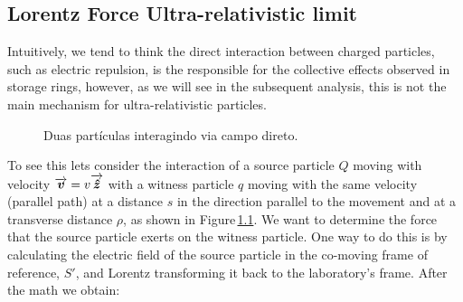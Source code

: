 \documentclass[
	12pt,				%
	openright,			%
	oneside,			%
	a4paper,		%
	chapter=TITLE,		%
	section=TITLE,		%
    brazil,				%
	english,			%
	sumario=tradicional,
	]{abntex2}
\begin{document}
\begin{apendicesenv}
\partapendices

\chapter{Lorentz Force Ultra-relativistic limit}\label{app:lorentz_cancel}
Intuitively, we tend to think the direct interaction between charged particles, such as electric repulsion, is the responsible for the collective effects observed in storage rings, however, as we will see in the subsequent analysis, this is not the main mechanism for ultra-relativistic particles.

\begin{figure}[hb!]
    \centering
    \label{fig:wake1}
    \caption{Duas partículas interagindo via campo direto.}
\end{figure}

To see this lets consider the interaction of a source particle $Q$ moving with velocity $\overrightarrow{\boldsymbol{v}}=v{\overrightarrow{\boldsymbol{\hat{z}}}}$ with a witness particle $q$ moving with the same velocity (parallel path) at a distance $s$ in the direction parallel to the movement and at a transverse distance $\rho$, as shown in Figure\,\ref{fig:wake1}. We want to determine the force that the source particle exerts on the witness particle. One way to do this is by calculating the electric field of the source particle in the co-moving frame of reference, $S'$, and Lorentz transforming it back to the laboratory's frame. After the math we obtain:


\end{apendicesenv}
\end{document}
